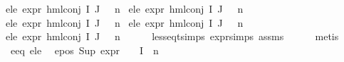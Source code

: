 \begin{isabellebody}
e{}{\isacharunderscore}{\kern0pt}le{\isacharcolon}{\kern0pt}\ {\isachardoublequoteopen}expr{\isacharunderscore}{\kern0pt}{}\ {\isacharparenleft}{\kern0pt}hml{\isacharunderscore}{\kern0pt}conj\ I\ J\ {\isasymPhi}{\isacharparenright}{\kern0pt}\ {\isasymle}\ n{}{\isachardoublequoteclose}\ \isanewline
e{}{\isacharunderscore}{\kern0pt}le{\isacharcolon}{\kern0pt}\ {\isachardoublequoteopen}expr{\isacharunderscore}{\kern0pt}{}\ {\isacharparenleft}{\kern0pt}hml{\isacharunderscore}{\kern0pt}conj\ I\ J\ {\isasymPhi}{\isacharparenright}{\kern0pt}\ {\isasymle}\ n{}{\isachardoublequoteclose}\ \isanewline
e{}{\isacharunderscore}{\kern0pt}le{\isacharcolon}{\kern0pt}\ {\isachardoublequoteopen}expr{\isacharunderscore}{\kern0pt}{}\ {\isacharparenleft}{\kern0pt}hml{\isacharunderscore}{\kern0pt}conj\ I\ J\ {\isasymPhi}{\isacharparenright}{\kern0pt}\ {\isasymle}\ n{}{\isachardoublequoteclose}\ \isanewline
e{}{\isacharunderscore}{\kern0pt}le{\isacharcolon}{\kern0pt}\ {\isachardoublequoteopen}expr{\isacharunderscore}{\kern0pt}{}\ {\isacharparenleft}{\kern0pt}hml{\isacharunderscore}{\kern0pt}conj\ I\ J\ {\isasymPhi}{\isacharparenright}{\kern0pt}\ {\isasymle}\ n{}{\isachardoublequoteclose}\ \isanewline
e{}{\isacharunderscore}{\kern0pt}le{\isacharcolon}{\kern0pt}\ {\isachardoublequoteopen}expr{\isacharunderscore}{\kern0pt}{}\ {\isacharparenleft}{\kern0pt}hml{\isacharunderscore}{\kern0pt}conj\ I\ J\ {\isasymPhi}{\isacharparenright}{\kern0pt}\ {\isasymle}\ n{}{\isachardoublequoteclose}\isanewline
\ \ \ \ \isamarkupfalse%
\ less{\isacharunderscore}{\kern0pt}eq{\isacharunderscore}{\kern0pt}t{\isachardot}{\kern0pt}simps\ expr{\isachardot}{\kern0pt}simps\ assms\isanewline
\ \ \ \ \isamarkupfalse%
\ metis{\isacharplus}{\kern0pt}\isanewline
\isanewline
\ \ \isamarkupfalse%
\ e{}{\isacharunderscore}{\kern0pt}eq\ e{}{\isacharunderscore}{\kern0pt}le\ \isamarkupfalse%
\ e{}{\isacharunderscore}{\kern0pt}pos{\isacharcolon}{\kern0pt}\ {\isachardoublequoteopen}Sup\ {\isacharparenleft}{\kern0pt}{\isacharparenleft}{\kern0pt}expr{\isacharunderscore}{\kern0pt}{}\ {\isasymcirc}\ {\isasymPhi}{\isacharparenright}{\kern0pt}\ {\isacharbackquote}{\kern0pt}\ I{\isacharparenright}{\kern0pt}\ {\isasymle}\ n{}{\isachardoublequoteclose}\isanewline

\end{isabellebody}
